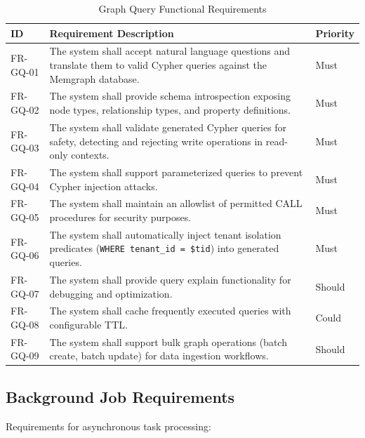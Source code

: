 \documentclass[a4paper,twoside]{sapthesis}
\begin{document}
\begin{table}[htbp]
\centering
\caption{Graph Query Functional Requirements}
\label{tab:fr-graph}
\small
\begin{tabularx}{\textwidth}{|l|X|l|}
\hline
\textbf{ID} & \textbf{Requirement Description} & \textbf{Priority} \\
\midrule
FR-GQ-01 & The system shall accept natural language questions and translate them to valid Cypher queries against the Memgraph database. & Must \\
\midrule
FR-GQ-02 & The system shall provide schema introspection exposing node types, relationship types, and property definitions. & Must \\
\midrule
FR-GQ-03 & The system shall validate generated Cypher queries for safety, detecting and rejecting write operations in read-only contexts. & Must \\
\midrule
FR-GQ-04 & The system shall support parameterized queries to prevent Cypher injection attacks. & Must \\
\midrule
FR-GQ-05 & The system shall maintain an allowlist of permitted CALL procedures for security purposes. & Must \\
\midrule
FR-GQ-06 & The system shall automatically inject tenant isolation predicates (\texttt{WHERE tenant\_id = \$tid}) into generated queries. & Must \\
\midrule
FR-GQ-07 & The system shall provide query explain functionality for debugging and optimization. & Should \\
\midrule
FR-GQ-08 & The system shall cache frequently executed queries with configurable TTL. & Could \\
\midrule
FR-GQ-09 & The system shall support bulk graph operations (batch create, batch update) for data ingestion workflows. & Should \\
\midrule
\end{tabularx}
\end{table}

\subsection{Background Job Requirements}
\label{subsec:fr-jobs}

Requirements for asynchronous task processing:
\end{document}
